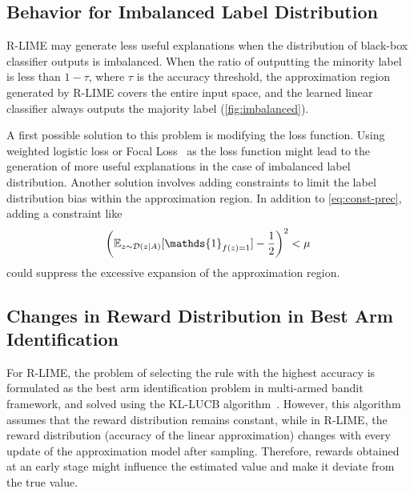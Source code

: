 \documentclass[runningheads]{llncs}
\begin{document}
\subsection{Behavior for Imbalanced Label Distribution}
R-LIME may generate less useful explanations
when the distribution of black-box classifier outputs is imbalanced.
When the ratio of outputting the minority label is less than $1-\tau$,
where $\tau$ is the accuracy threshold,
the approximation region generated by R-LIME covers the entire input space,
and the learned linear classifier always outputs the majority label
(\cref{fig:imbalanced}).

A first possible solution to this problem is modifying the loss function.
Using weighted logistic loss or Focal Loss~\cite{lin2020focal}
as the loss function might lead to the generation of more useful explanations
in the case of imbalanced label distribution.
Another solution involves adding constraints
to limit the label distribution bias within the approximation region.
In addition to \cref{eq:const-prec}, adding a constraint like
\begin{equation}
  {%
    \left(
    \mathbb{E}_{z\sim\mathcal{D}(z\mid A)}[\mathds{1}_{f(z)=1}]-\frac{1}{2}
    \right)
  }^2<\mu
\end{equation}
could suppress the excessive expansion of the approximation region.

\subsection{Changes in Reward Distribution in Best Arm Identification}\label{sec:reward}
{%
  \renewcommand{\arraystretch}{1.1}
  \begin{table}[tbp]
    \centering
    \caption[Deviation between the estimated accuracy and the true accuracy]{%
      Deviation between the estimated accuracy and the true accuracy
      of the linear classifier learned by R-LIME\@.
      The deviation $0.012\pm0.017$ was relatively small
      considering the confidence level $1-\delta=0.95$.
    }\label{tab:reward}
    
  \end{table}
}
For R-LIME,
the problem of selecting the rule with the highest accuracy is formulated
as the best arm identification problem in multi-armed bandit framework,
and solved using the KL-LUCB algorithm~\cite{kaufmann2013information}.
However, this algorithm assumes that the reward distribution remains constant,
while in R-LIME,
the reward distribution (accuracy of the linear approximation)
changes with every update of the approximation model after sampling.
Therefore, rewards obtained at an early stage
might influence the estimated value and
make it deviate from the true value.
\end{document}
